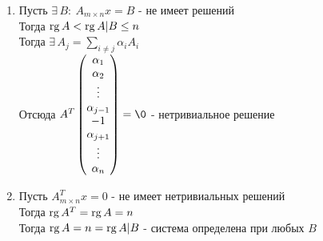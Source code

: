 \documentclass[12pt]{article}
\begin{document}
\begin{enumerate}
    \item Пусть $\exists\,B:\ A_{m \times n}x=B$ - не имеет решений\\
    Тогда $\operatorname{rg} A < \operatorname{rg} A|B \leq n$\\
    Тогда $\exists\, A_j = \sum_{i\neq j} \alpha_i A_i$\\
    Отсюда $A^T \begin{pmatrix}
        \alpha_1\\\alpha_2\\\vdots\\\alpha_{j-1}\\-1\\\alpha_{j+1}\\\vdots\\\alpha_n
    \end{pmatrix} = \0$ - нетривиальное решение
    \item Пусть $A_{m\times n}^Tx = 0$ - не имеет нетривиальных решений\\
    Тогда $\operatorname{rg} A^T = \operatorname{rg} A = n$\\
    Тогда $\operatorname{rg} A = n = \operatorname{rg} A|B$ - система определена при любых $B$
\end{enumerate}
\end{document}
